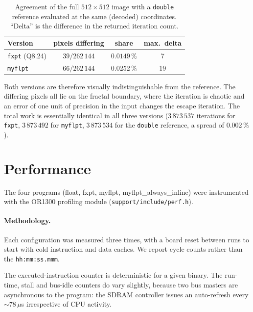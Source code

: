 \documentclass[10pt,a4paper]{article}
\newcommand{\Q}[2]{Q#1.#2}
\begin{document}
\begin{table}[h]
\centering\small
\caption{Agreement of the full $512\times512$ image with a \texttt{double} reference evaluated at
the same (decoded) coordinates. ``Delta'' is the difference in the returned iteration count.}
\label{tab:image}
\begin{tabular}{lccc}
\toprule
\textbf{Version} & \textbf{pixels differing} & \textbf{share} & \textbf{max.\ delta} \\
\midrule
\texttt{fxpt} (\Q{8}{24}) & $39 / 262\,144$ & $0.0149\,\%$ & 7 \\
\texttt{myflpt}           & $66 / 262\,144$ & $0.0252\,\%$ & 19 \\
\bottomrule
\end{tabular}
\end{table}

Both versions are therefore visually indistinguishable from the reference. The differing pixels all
lie on the fractal boundary, where the iteration is chaotic and an error of one unit of precision in the input
changes the escape iteration. The total work is essentially identical in all three versions
($3\,873\,537$ iterations for \texttt{fxpt}, $3\,873\,492$ for \texttt{myflpt}, $3\,873\,534$ for
the \texttt{double} reference, a spread of $0.002\,\%$).

\section{Performance}
\label{sec:perf}

The four programs (float, fxpt, myflpt, myflpt\_always\_inline) were instrumented with the OR1300 profiling module
(\texttt{support/include/perf.h}). 

\paragraph{Methodology.} Each configuration was measured three times, with a board reset between
runs to start with cold instruction and data caches.
We report cycle counts rather than the \texttt{hh:mm:ss.mmm}.

The executed-instruction counter is deterministic for a given binary. 
The run-time, stall and bus-idle counters do vary slightly, because two bus masters are asynchronous to the program: the SDRAM controller issues
an auto-refresh every $\sim 78\,\mu$s irrespective of CPU activity.
\end{document}
